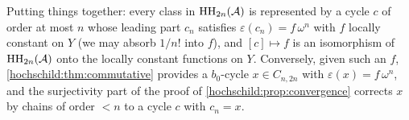 Putting things together: every class in $\operatorname{HH}_{2n}(\mathcal{A})$ is represented by a cycle $c$ of order at most $n$ whose leading
part $c_n$ satisfies $\varepsilon(c_n)=f\,\omega^n$ with $f$ locally constant on $Y$ (we may absorb $1/n!$ into $f$), and
$[c]\mapsto f$ is an isomorphism of $\operatorname{HH}_{2n}(\mathcal{A})$ onto the locally constant functions on $Y$. Conversely,
given such an $f$, \cref{hochschild:thm:commutative} provides a $b_0$-cycle $x\in C_{n,2n}$ with
$\varepsilon(x)=f\,\omega^n$, and the surjectivity part of the proof of \cref{hochschild:prop:convergence} corrects
$x$ by chains of order $<n$ to a cycle $c$ with $c_n=x$.
